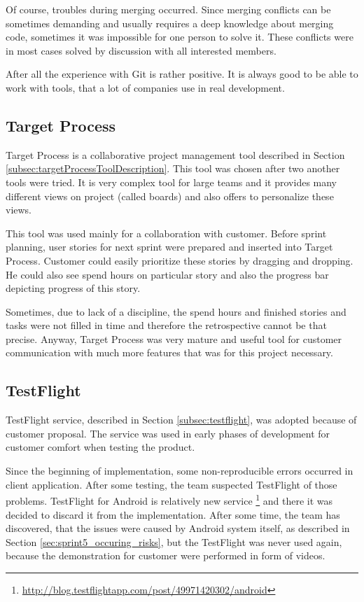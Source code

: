 Of course, troubles during merging occurred.
Since merging conflicts can be sometimes demanding and usually requires a deep knowledge about merging code, sometimes it was impossible for one person to solve it.
These conflicts were in most cases solved by discussion with all interested members.

After all the experience with Git is rather positive. 
It is always good to be able to work with tools, that a lot of companies use in real development.


\subsection{Target Process}
Target Process is a collaborative project management tool described in Section \ref{subsec:targetProcessToolDescription}.
This tool was chosen after two another tools were tried.
It is very complex tool for large teams and it provides many different views on project (called boards) and also offers to personalize these views.

This tool was used mainly for a collaboration with customer. 
Before sprint planning, user stories for next sprint were prepared and inserted into Target Process.
Customer could easily prioritize these stories by dragging and dropping.
He could also see spend hours on particular story and also the progress bar depicting progress of this story.

Sometimes, due to lack of a discipline, the spend hours and finished stories and tasks were not filled in time and therefore the retrospective cannot be that precise.
Anyway, Target Process was very mature and useful tool for customer communication with much more features that was for this project necessary.


\subsection{TestFlight}
TestFlight service, described in Section \ref{subsec:testflight}, was adopted because of customer proposal.
The service was used in early phases of development for customer comfort when testing the product.

Since the beginning of implementation, some non-reproducible errors occurred in client application.
After some testing, the team suspected TestFlight of those problems.
TestFlight for Android is relatively new service \footnote{\url{http://blog.testflightapp.com/post/49971420302/android}} and there it was decided to discard it from the implementation.
After some time, the team has discovered, that the issues were caused by Android system itself, as described in Section \ref{sec:sprint5_occuring_risks}, but the TestFlight was never used again, because the demonstration for customer were performed in form of videos.
 
